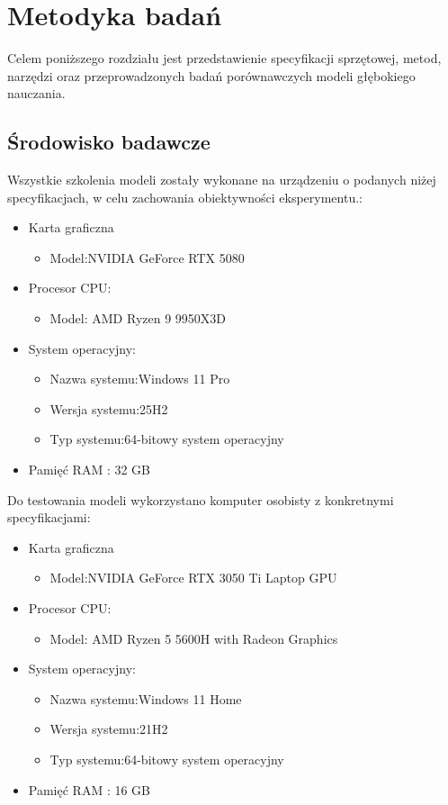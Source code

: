 \newpage
\section{Metodyka badań}
\label{sec:metodyka}
Celem poniższego rozdziału jest przedstawienie specyfikacji sprzętowej, metod, narzędzi oraz przeprowadzonych badań porównawczych modeli głębokiego nauczania.

\subsection{Środowisko badawcze}
Wszystkie szkolenia modeli zostały wykonane na urządzeniu o podanych niżej specyfikacjach, w celu zachowania obiektywności eksperymentu.: 
\begin{itemize}
	\item Karta graficzna
	\begin{itemize}
		\item Model:NVIDIA GeForce RTX 5080
	\end{itemize}
	\item Procesor CPU: 
	\begin{itemize}
		\item Model: AMD Ryzen 9 9950X3D
	\end{itemize}
	\item System operacyjny:
	\begin{itemize}
		\item Nazwa systemu:Windows 11 Pro
		\item Wersja systemu:25H2
		\item Typ systemu:64-bitowy system operacyjny
	\end{itemize}
	\item Pamięć RAM : 32 GB
\end{itemize}
Do testowania modeli wykorzystano komputer osobisty z konkretnymi specyfikacjami:
\begin{itemize}
\item Karta graficzna
	\begin{itemize}
		\item Model:NVIDIA GeForce RTX 3050 Ti Laptop GPU
	\end{itemize}
\item Procesor CPU: 
\begin{itemize}
	\item Model: AMD Ryzen 5 5600H with Radeon Graphics
\end{itemize}
\item System operacyjny:
\begin{itemize}
	\item Nazwa systemu:Windows 11 Home
	\item Wersja systemu:21H2
	\item Typ systemu:64-bitowy system operacyjny
\end{itemize}
\item Pamięć RAM : 16 GB
\end{itemize}

